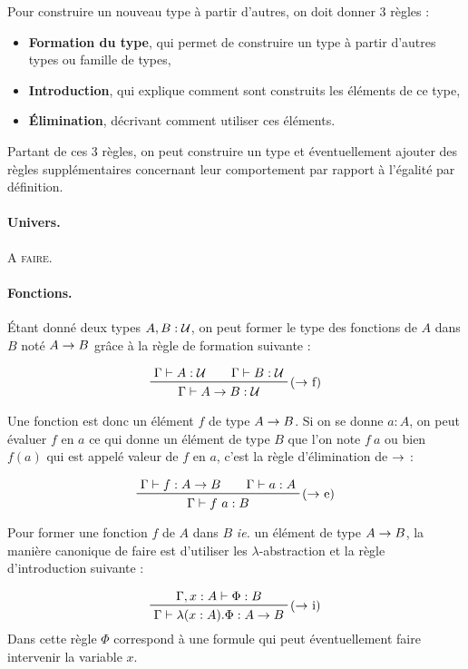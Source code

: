 \documentclass[../../rapport.tex]{subfiles}
\begin{document}
  Pour construire un nouveau type à partir d'autres, on doit donner 3 règles :
  \begin{itemize}
    \item \textbf{Formation du type}, qui permet de construire un type à partir d'autres types ou famille de types,
    \item \textbf{Introduction}, qui explique comment sont construits les éléments de ce type,
    \item \textbf{Élimination}, décrivant comment utiliser ces éléments.
  \end{itemize}

  Partant de ces 3 règles, on peut construire un type et éventuellement ajouter des règles supplémentaires concernant
  leur comportement par rapport à l'égalité par définition.

  \paragraph{Univers.}

  \textsc{A faire.}

  \paragraph{Fonctions.}

  Étant donné deux types $A, B : \mathcal U$, on peut former le type des fonctions de $A$ dans $B$ noté $A \rightarrow B$
  grâce à la règle de formation suivante :

  $$
  \prfinterspace=2em
  \prftree[r]{($\fun$ f)}{\Gamma \vdash A : \U}{\Gamma \vdash B : \U}{\Gamma \vdash A \fun B : \U}
  $$

  Une fonction est donc un élément $f$ de type $A \rightarrow B$.
  Si on se donne $a : A$, on peut évaluer $f$ en $a$ ce qui donne un élément de type $B$
  que l'on note $f\ a$ ou bien $f(a)$ qui est appelé valeur de $f$ en $a$, c'est la règle d'élimination de $\rightarrow$ :

  $$
  \prfinterspace=2em
  \prftree[r]{($\fun$ e)}{\Gamma \vdash f : A \fun B}{\Gamma \vdash a : A}{\Gamma \vdash f\ a : B}
  $$

  Pour former une fonction $f$ de $A$ dans $B$ \textit{ie.} un élément de type $A \rightarrow B$,
  la manière canonique de faire est d'utiliser les $\lambda$-abstraction et la règle d'introduction suivante :

  $$
  \prftree[r]{($\fun$ i)}{\Gamma, x : A \vdash \Phi : B}{\Gamma \vdash \lambda (x : A). \Phi : A \fun B}
  $$
  Dans cette règle $\Phi$ correspond à une formule qui peut éventuellement faire intervenir la variable $x$.
\end{document}
